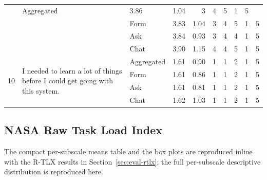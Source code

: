 \begin{table}
\begin{tabularx}{\linewidth}{@{}c X l r r r r r r r@{}}
                    & Aggregated  & 3.86 & 1.04 & 3 & 4 & 5 & 1 & 5 \\
                    & & Form & 3.83 & 1.04 & 3 & 4 & 5 & 1 & 5 \\
                    & & Ask  & 3.84 & 0.93 & 3 & 4 & 4 & 1 & 5 \\
                    & & Chat & 3.90 & 1.15 & 4 & 4 & 5 & 1 & 5 \\
\midrule
\multirow{4}{*}{10} & \multirow{4}{*}{I needed to learn a lot of things before I could get going with this system.}
                    & Aggregated  & 1.61 & 0.90 & 1 & 1 & 2 & 1 & 5 \\
                    & & Form & 1.61 & 0.86 & 1 & 1 & 2 & 1 & 5 \\
                    & & Ask  & 1.61 & 0.81 & 1 & 1 & 2 & 1 & 5 \\
                    & & Chat & 1.62 & 1.03 & 1 & 1 & 2 & 1 & 5 \\
\bottomrule
\end{tabularx}
\end{table}

\subsection{NASA Raw Task Load Index}
\label{app:items-rtlx}

The compact per-subscale means table and the box plots are
reproduced inline with the R-TLX results in
Section~\ref{sec:eval-rtlx}; the full per-subscale descriptive
distribution is reproduced here.

